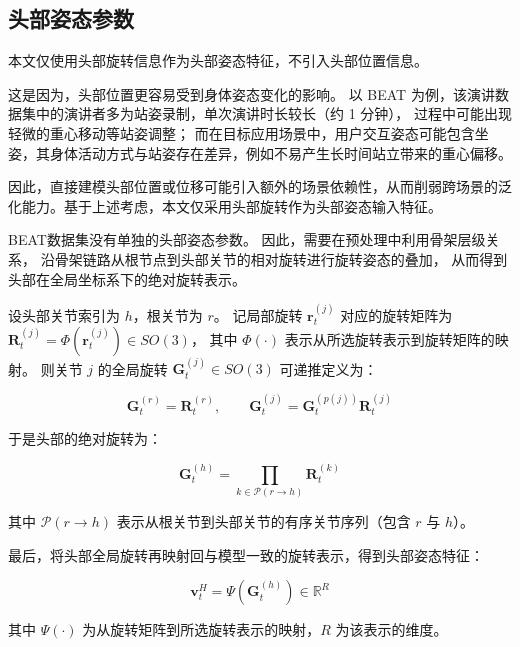 \subsection{头部姿态参数}

本文仅使用头部旋转信息作为头部姿态特征，不引入头部位置信息。

这是因为，头部位置更容易受到身体姿态变化的影响。
以 BEAT\cite{beatcamn} 为例，该演讲数据集中的演讲者多为站姿录制，单次演讲时长较长（约 1 分钟），
过程中可能出现轻微的重心移动等站姿调整；
而在目标应用场景中，用户交互姿态可能包含坐姿，其身体活动方式与站姿存在差异，例如不易产生长时间站立带来的重心偏移。

因此，直接建模头部位置或位移可能引入额外的场景依赖性，从而削弱跨场景的泛化能力。基于上述考虑，本文仅采用头部旋转作为头部姿态输入特征。

BEAT数据集没有单独的头部姿态参数。
因此，需要在预处理中利用骨架层级关系，
沿骨架链路从根节点到头部关节的相对旋转进行旋转姿态的叠加，
从而得到头部在全局坐标系下的绝对旋转表示。

设头部关节索引为 $h$，根关节为 $r$。
记局部旋转 $\mathbf{r}_t^{(j)}$ 对应的旋转矩阵为
$\mathbf{R}_t^{(j)}=\Phi(\mathbf{r}_t^{(j)})\in SO(3)$，
其中 $\Phi(\cdot)$ 表示从所选旋转表示到旋转矩阵的映射。
则关节 $j$ 的全局旋转 $\mathbf{G}_t^{(j)}\in SO(3)$ 可递推定义为：

\begin{equation}
\mathbf{G}_t^{(r)} = \mathbf{R}_t^{(r)},\qquad
\mathbf{G}_t^{(j)} = \mathbf{G}_t^{(p(j))}\mathbf{R}_t^{(j)}
\label{eq:global_rotation_recursion}
\end{equation}

于是头部的绝对旋转为：

\begin{equation}
\mathbf{G}_t^{(h)} =
\prod_{k\in \mathcal{P}(r\rightarrow h)} \mathbf{R}_t^{(k)}
\label{eq:head_global_rotation_product}
\end{equation}

其中 $\mathcal{P}(r\rightarrow h)$ 表示从根关节到头部关节的有序关节序列（包含 $r$ 与 $h$）。

最后，将头部全局旋转再映射回与模型一致的旋转表示，得到头部姿态特征：

\begin{equation}
\bm{v}^{H}_t = \Psi\!\left(\mathbf{G}_t^{(h)}\right)\in\mathbb{R}^{R}
\label{eq:head_pose_vector}
\end{equation}

其中 $\Psi(\cdot)$ 为从旋转矩阵到所选旋转表示的映射，$R$ 为该表示的维度。

